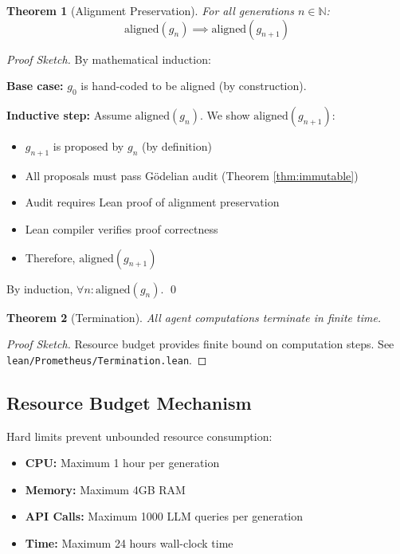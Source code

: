 \documentclass[11pt,letterpaper]{article}
\newtheorem{theorem}{Theorem}
\begin{document}
\begin{theorem}[Alignment Preservation]
\label{thm:alignment}
For all generations $n \in \mathbb{N}$:
$$\text{aligned}(g_n) \implies \text{aligned}(g_{n+1})$$
\end{theorem}

\begin{proof}[Proof Sketch]
By mathematical induction:

\textbf{Base case:} $g_0$ is hand-coded to be aligned (by construction).

\textbf{Inductive step:} Assume $\text{aligned}(g_n)$. We show $\text{aligned}(g_{n+1})$:
\begin{itemize}
\item $g_{n+1}$ is proposed by $g_n$ (by definition)
\item All proposals must pass Gödelian audit (Theorem \ref{thm:immutable})
\item Audit requires Lean proof of alignment preservation
\item Lean compiler verifies proof correctness
\item Therefore, $\text{aligned}(g_{n+1})$
\end{itemize}

By induction, $\forall n : \text{aligned}(g_n)$. \qed
\end{proof}

\begin{theorem}[Termination]
\label{thm:termination}
All agent computations terminate in finite time.
\end{theorem}

\begin{proof}[Proof Sketch]
Resource budget provides finite bound on computation steps. See \texttt{lean/Prometheus/Termination.lean}.
\end{proof}

\subsection{Resource Budget Mechanism}
\label{sec:budget}

Hard limits prevent unbounded resource consumption:

\begin{itemize}
\item \textbf{CPU:} Maximum 1 hour per generation
\item \textbf{Memory:} Maximum 4GB RAM
\item \textbf{API Calls:} Maximum 1000 LLM queries per generation
\item \textbf{Time:} Maximum 24 hours wall-clock time
\end{itemize}
\end{document}
